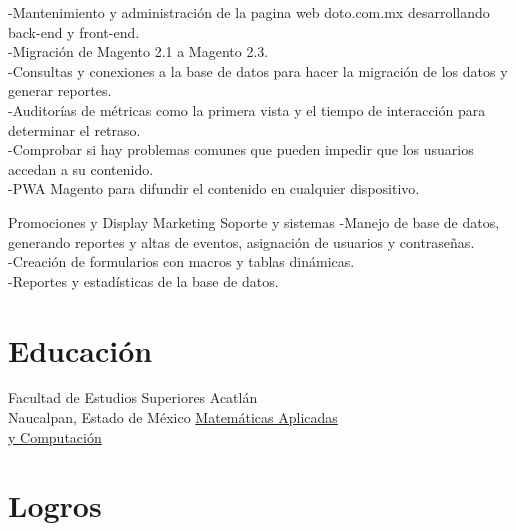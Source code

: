 \documentclass[%
	       doublesided,
	       paper=a4,
	       fontsize=10pt
	      ]{my-resume}
\begin{document}
{{	    -Mantenimiento y administración de la pagina web doto.com.mx desarrollando back-end y front-end.\\
	    -Migración de Magento 2.1 a Magento 2.3.\\
	    -Consultas y conexiones a la base de datos para hacer la migración de los datos y generar reportes.\\ 
	    -Auditorías de métricas como la primera vista y el tiempo de interacción para determinar el retraso.\\ 
	    -Comprobar si hay problemas comunes que pueden impedir que los usuarios accedan a su contenido.\\
	    -PWA Magento para difundir el contenido en cualquier dispositivo.
	}
    
	{Promociones y Display Marketing}
	{Soporte y sistemas}
	{
	    -Manejo de base de datos, generando reportes y altas de eventos, asignación de usuarios y contraseñas.\\
	    -Creación de formularios con macros y tablas dinámicas.\\ 
	    -Reportes y estadísticas de la base de datos.
    }
    \section[\faMortarBoard]{Educación}
	{Facultad de Estudios Superiores Acatlán \\ Naucalpan, Estado de México}
	{\href{https://mac.acatlan.unam.mx/}{Matemáticas Aplicadas \\y Computación}}
	{}

}

\makebody
\clearpage


\pagestyle{highlightmain}
\highlightbar{}
\section{Logros}
\end{document}
